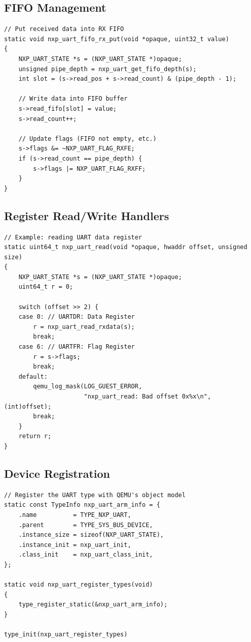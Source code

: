 \documentclass{article}
\begin{document}
\subsection{FIFO Management}

\begin{verbatim}
// Put received data into RX FIFO
static void nxp_uart_fifo_rx_put(void *opaque, uint32_t value)
{
    NXP_UART_STATE *s = (NXP_UART_STATE *)opaque;
    unsigned pipe_depth = nxp_uart_get_fifo_depth(s);
    int slot = (s->read_pos + s->read_count) & (pipe_depth - 1);

    // Write data into FIFO buffer
    s->read_fifo[slot] = value;
    s->read_count++;

    // Update flags (FIFO not empty, etc.)
    s->flags &= ~NXP_UART_FLAG_RXFE;
    if (s->read_count == pipe_depth) {
        s->flags |= NXP_UART_FLAG_RXFF;
    }
}
\end{verbatim}

\subsection{Register Read/Write Handlers}

\begin{verbatim}
// Example: reading UART data register
static uint64_t nxp_uart_read(void *opaque, hwaddr offset, unsigned size)
{
    NXP_UART_STATE *s = (NXP_UART_STATE *)opaque;
    uint64_t r = 0;

    switch (offset >> 2) {
    case 0: // UARTDR: Data Register
        r = nxp_uart_read_rxdata(s);
        break;
    case 6: // UARTFR: Flag Register
        r = s->flags;
        break;
    default:
        qemu_log_mask(LOG_GUEST_ERROR,
                      "nxp_uart_read: Bad offset 0x%x\n", (int)offset);
        break;
    }
    return r;
}
\end{verbatim}

\subsection{Device Registration}

\begin{verbatim}
// Register the UART type with QEMU's object model
static const TypeInfo nxp_uart_arm_info = {
    .name          = TYPE_NXP_UART,
    .parent        = TYPE_SYS_BUS_DEVICE,
    .instance_size = sizeof(NXP_UART_STATE),
    .instance_init = nxp_uart_init,
    .class_init    = nxp_uart_class_init,
};

static void nxp_uart_register_types(void)
{
    type_register_static(&nxp_uart_arm_info);
}

type_init(nxp_uart_register_types)
\end{verbatim}
\end{document}
